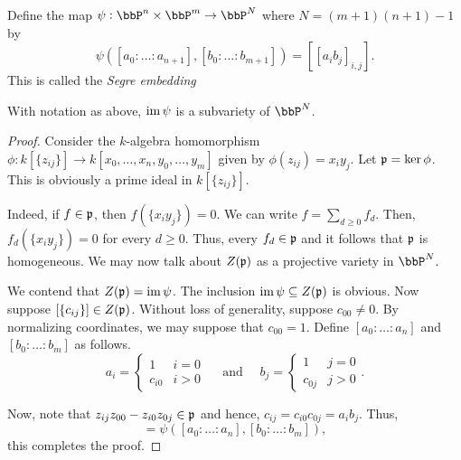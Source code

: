 \begin{definition}
    Define the map $\psi:\bbP^n\times\bbP^m\to\bbP^{N}$ where $N = (m + 1)(n + 1) - 1$ by 
    \begin{equation*}
        \psi\left([a_0 : \dots : a_{n + 1}], [b_0 : \dots : b_{m + 1}]\right) = [[a_ib_j]_{i, j}].
    \end{equation*}
    This is called the \emph{Segre embedding}
\end{definition}

\begin{proposition}
    With notation as above, $\operatorname{im}\psi$ is a subvariety of $\bbP^N$.
\end{proposition}
\begin{proof}
    Consider the $k$-algebra homomorphism $\phi: k[\{z_{ij}\}]\to k[x_0,\dots,x_n,y_0,\dots,y_m]$ given by $\phi(z_{ij}) = x_iy_j$. Let $\mathfrak p = \ker\phi$. This is obviously a prime ideal in $k[\{z_{ij}\}]$. 

    Indeed, if $f\in\mathfrak p$, then $f(\{x_iy_j\}) = 0$. We can write $f = \sum_{d\ge 0} f_d$. Then, $f_d(\{x_iy_j\}) = 0$ for every $d\ge 0$. Thus, every $f_d\in\mathfrak p$ and it follows that $\mathfrak p$ is homogeneous. We may now talk about $Z(\mathfrak p)$ as a projective variety in $\bbP^N$.

    We contend that $Z(\mathfrak p) = \operatorname{im}\psi$. The inclusion $\operatorname{im}\psi\subseteq Z(\mathfrak p)$ is obvious. Now suppose $[\{c_{ij}\}]\in Z(\mathfrak p)$. Without loss of generality, suppose $c_{00}\ne 0$. By normalizing coordinates, we may suppose that $c_{00} = 1$. Define $[a_0:\dots:a_n]$ and $[b_0:\dots:b_m]$ as follows. 
    \begin{equation*}
        a_i = 
        \begin{cases}
            1 & i = 0\\
            c_{i0} & i > 0
        \end{cases}
        \quad\text{ and }\quad
        b_j = 
        \begin{cases}
            1 & j = 0\\
            c_{0j} & j > 0
        \end{cases}.
    \end{equation*}

    Now, note that $z_{ij}z_{00} - z_{i0}z_{0j}\in\mathfrak p$ and hence, $c_{ij} = c_{i0}c_{0j} = a_ib_j$. Thus, 
    \begin{equation*}
        [\{c_{ij}\}] = \psi\left([a_0:\dots:a_n], [b_0:\dots:b_m]\right),
    \end{equation*}
    this completes the proof.
\end{proof}

